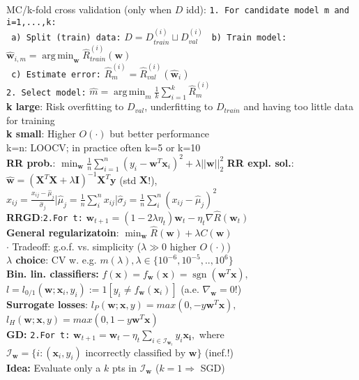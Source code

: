 \documentclass[11pt]{article}
\newcommand{\bv}[1]{\mathbf{#1}}
\newcommand{\est}[1]{\mathbf{\hat{#1}}}
\DeclareMathOperator*{\argmin}{arg\,min}
\DeclareMathOperator*{\sgn}{sgn}
\begin{document}
\begin{multicols}{4}
MC/k-fold cross validation (only when $D$ idd):
\verb|1. For candidate model m and i=1,...,k:|\\
\verb| a) Split (train) data:| $D=D^{(i)}_{train}\sqcup D^{(i)}_{val}$
\verb| b) Train model:| $\est{w}_{i,m}=\argmin_{\bv{w}}\hat{R}^{(i)}_{train}(\bv{w})$\\
\verb| c) Estimate error:| $\hat{R}^{(i)}_{m}=\hat{R}^{(i)}_{val}(\est{w}_i)$\\
\verb|2. Select model:| $\hat{m}=\argmin_m\frac{1}{k}\sum^k_{i=1}\hat{R}^{(i)}_m$\\
\textbf{k large}: Risk overfitting to $D_{val}$, underfitting to $D_{train}$ and having too little data for training\\
\textbf{k small}: Higher $O(\cdot)$ but better performance\\
k=n: LOOCV; in practice often k=5 or k=10\\
\textbf{RR prob.}: $\min_{\bv{w}}\frac{1}{n}\sum^n_{i=1}(y_i-\bv{w}^T\bv{x}_i)^2+\lambda||\bv{w}||^2_2$
\textbf{RR expl. sol.}: $\est{w}=(\bv{X}^T\bv{X}+\lambda\bv{I})^{-1}\bv{X}^T\bv{y}$ (std $\bv{X}$!),\\
$x_{ij}=\frac{x_{ij}-\hat{\mu}_j}{\hat{\sigma}_j}$|$\hat{\mu}_j=\frac{1}{n}\sum_i^n x_{ij}$|$\hat{\sigma}_j=\frac{1}{n}\sum_i^n (x_{ij}-\hat{\mu}_{j})^2$\\
\textbf{RRGD}:\verb|2.For t:| $\bv{w}_{t+1}=(1-2\lambda \eta_t)\bv{w}_t-\eta_t \nabla \hat{R}(\bv{w}_t)$\\
\textbf{General regularizatoin}: $\min_{\bv{w}}\hat{R}(\bv{w})+\lambda C(\bv{w})$\\
$\cdot$ Tradeoff: g.o.f. vs. simplicity ($\lambda\gg0$ higher $O(\cdot)$)\\
\textbf{$\lambda$ choice}: CV w. e.g. $m(\lambda),\lambda\in\{10^{-6},10^{-5},..,10^6\}$\\
\textbf{Bin. lin. classifiers:} $f(\bv{x})=f_{\bv{w}}(\bv{x})=\sgn(\bv{w}^T\bv{x}),$\\
$l=l_{0/1}(\bv{w};\bv{x}_i,y_i):=1[y_i\neq f_{\bv{w}}(\bv{x}_i)]$ (a.e. $\nabla_{\bv{w}}=0$!)\\
\textbf{Surrogate losses}: $l_P(\bv{w};\bv{x},y)=max(0,-y\bv{w}^T\bv{x}),$
$l_H(\bv{w};\bv{x},y)=max(0,1-y\bv{w}^T\bv{x})$\\
\textbf{GD:} \verb|2.For t:| $\bv{w}_{t+1}=\bv{w}_t-\eta_t \sum_{i\in\mathcal{I}_{\bv{w}_t}}y_i\bv{x_i},$ where $\mathcal{I}_\bv{w}=\{i:(\bv{x}_i,y_i) \textrm{ incorrectly classified by } \bv{w}\}$ (inef.!)\\
\textbf{Idea:} Evaluate only a $k$ pts in $\mathcal{I}_\bv{w}$ ($k=1\Rightarrow$ SGD)\\

\end{multicols}
\end{document}
